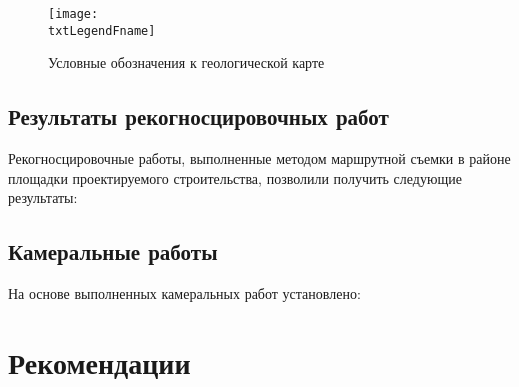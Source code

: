 \begin{figure}[!h]
	\centering
	\texttt{[image: \\txtLegendFname]}
	\caption[Условные обозначения]{Условные обозначения к геологической карте}
	\label{img:legend}
\end{figure}

\subsection{Результаты рекогносцировочных работ}
Рекогносцировочные работы, выполненные методом маршрутной съемки в районе площадки проектируемого строительства, позволили получить следующие результаты:

\txtRecog

\subsection{Камеральные работы}
На основе выполненных камеральных работ установлено:
\txtCamer

\section{Рекомендации}
\txtRecommend



